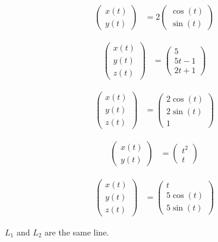 \documentclass[8pt]{extarticle}
\title{}
\author{}
\date{}
\begin{document}
\renewcommand{\arraystretch}{1.5}
  \begin{problem}{17.1}
    \begin{description}[font=\normalfont]
      \item[2:]
        \begin{align*}
          \begin{pmatrix}x(t)\\y(t)\end{pmatrix} &= 2\begin{pmatrix}\cos(t)\\\sin(t)\end{pmatrix}\tag*{$0\leq t\leq \pi/2$}
        \end{align*}
      \item[10:]
        \begin{align*}
          \begin{pmatrix}x(t)\\y(t)\\z(t)\end{pmatrix} &= \begin{pmatrix}5\\5t - 1\\2t+1\end{pmatrix}
        \end{align*}
      \item[22:]
        \begin{align*}
          \begin{pmatrix}x(t)\\y(t)\\z(t)\end{pmatrix} &= \begin{pmatrix}2\cos(t)\\2\sin(t)\\1\end{pmatrix}
        \end{align*}
      \item[40:]
        \begin{align*}
          \begin{pmatrix}x(t)\\y(t)\end{pmatrix} &= \begin{pmatrix}t^2\\t\end{pmatrix}\tag*{$1\leq t \leq 8$}
        \end{align*}
      \item[44:]
        \begin{align*}
          \begin{pmatrix}x(t)\\y(t)\\z(t)\end{pmatrix} &= \begin{pmatrix}t\\5\cos(t)\\5\sin(t)\end{pmatrix}
        \end{align*}
      \item[64:] $L_1$ and $L_2$ are the same line.
    \end{description}
  \end{problem}
\end{document}
